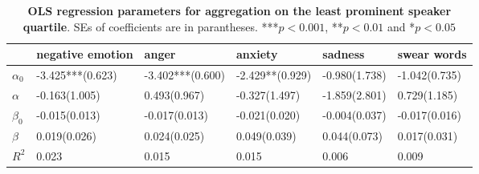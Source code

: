 \begin{table}[h]
\begin{adjustbox}{width=\linewidth, center}
\end{adjustbox}
	\end{table}

\begin{table}[h]\centering
\caption{\textbf{OLS regression parameters for aggregation on the least prominent speaker quartile}. SEs of coefficients are in parantheses. ***$p < 0.001$, **$p < 0.01$ and *$p < 0.05$}
	\label{fig: Verbosity_7}
\begin{adjustbox}{width=\linewidth, center}
	\begin{tabular}{llllll}
	\toprule
	{} &                                          negative emotion &                                                     anger &                                                   anxiety &                                                   sadness &                                               swear words \\
	\midrule
	$\alpha_0$       &                                          -3.425***(0.623) &                                          -3.402***(0.600) &                                -2.429**\phantom{*}(0.929) &            -0.980\phantom{*}\phantom{*}\phantom{*}(1.738) &            -1.042\phantom{*}\phantom{*}\phantom{*}(0.735) \\
	$\alpha$         &            -0.163\phantom{*}\phantom{*}\phantom{*}(1.005) &  \phantom{-}0.493\phantom{*}\phantom{*}\phantom{*}(0.967) &            -0.327\phantom{*}\phantom{*}\phantom{*}(1.497) &            -1.859\phantom{*}\phantom{*}\phantom{*}(2.801) &  \phantom{-}0.729\phantom{*}\phantom{*}\phantom{*}(1.185) \\
	$\beta_0$        &            -0.015\phantom{*}\phantom{*}\phantom{*}(0.013) &            -0.017\phantom{*}\phantom{*}\phantom{*}(0.013) &            -0.021\phantom{*}\phantom{*}\phantom{*}(0.020) &            -0.004\phantom{*}\phantom{*}\phantom{*}(0.037) &            -0.017\phantom{*}\phantom{*}\phantom{*}(0.016) \\
	$\beta$          &  \phantom{-}0.019\phantom{*}\phantom{*}\phantom{*}(0.026) &  \phantom{-}0.024\phantom{*}\phantom{*}\phantom{*}(0.025) &  \phantom{-}0.049\phantom{*}\phantom{*}\phantom{*}(0.039) &  \phantom{-}0.044\phantom{*}\phantom{*}\phantom{*}(0.073) &  \phantom{-}0.017\phantom{*}\phantom{*}\phantom{*}(0.031) \\
	$R^2$            &                                                     0.023 &                                                     0.015 &                                                     0.015 &                                                     0.006 &                                                     0.009 \\

\end{tabular}
\end{adjustbox}
\end{table}
